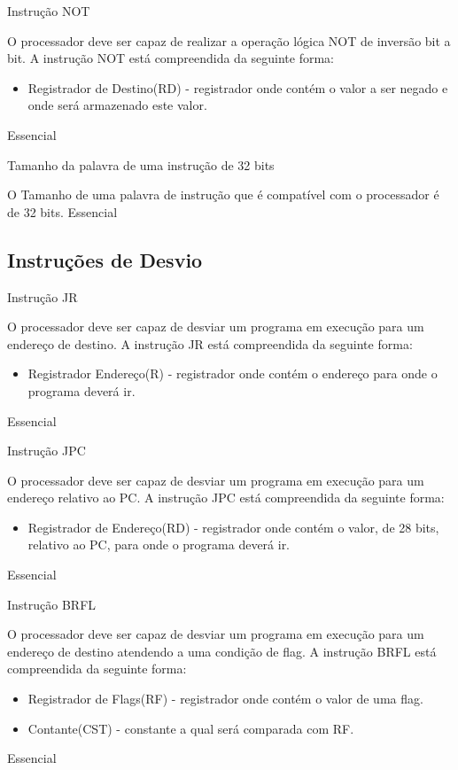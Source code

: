 \documentclass{article}
\begin{document}
\begin{functional}
{      \requirement
      {Instrução NOT}
      {O processador deve ser capaz de realizar a operação lógica NOT de inversão bit a bit.
      A instrução NOT está compreendida da seguinte forma:
       \begin{itemize}
         \item Registrador de Destino(RD) - registrador onde contém o valor a ser negado e onde será armazenado este valor.
         \end{itemize}}
      {Essencial}

      \requirement
      {Tamanho da palavra de uma instrução de 32 bits}
      {O Tamanho de uma palavra de instrução que é compatível com o processador é de 32 bits.
      {Essencial}

    \subsection{Instruções de Desvio}

    \begin{functional}
      \requirement
      {Instrução JR}
      {O processador deve ser capaz de desviar um programa em execução para um endereço de destino.
      A instrução JR está compreendida da seguinte forma:
       \begin{itemize}
         \item Registrador Endereço(R) - registrador onde contém o endereço para onde o programa deverá ir.
         \end{itemize}}
      {Essencial}

      \requirement
      {Instrução JPC}
      {O processador deve ser capaz de desviar um programa em execução para um endereço relativo ao PC.
      A instrução JPC está compreendida da seguinte forma:
       \begin{itemize}
         \item Registrador de Endereço(RD) - registrador onde contém o valor, de 28 bits, relativo ao PC, para onde o programa deverá ir.
         \end{itemize}}
      {Essencial}

      \requirement
      {Instrução BRFL}
      {O processador deve ser capaz de desviar um programa em execução para um endereço de destino atendendo a uma condição de flag.
      A instrução BRFL está compreendida da seguinte forma:
       \begin{itemize}
         \item Registrador de Flags(RF) - registrador onde contém o valor de uma flag.
         \item Contante(CST) - constante a qual será comparada com RF.
         \end{itemize}}
      {Essencial}


\end{functional}}}
\end{functional}
\end{document}
